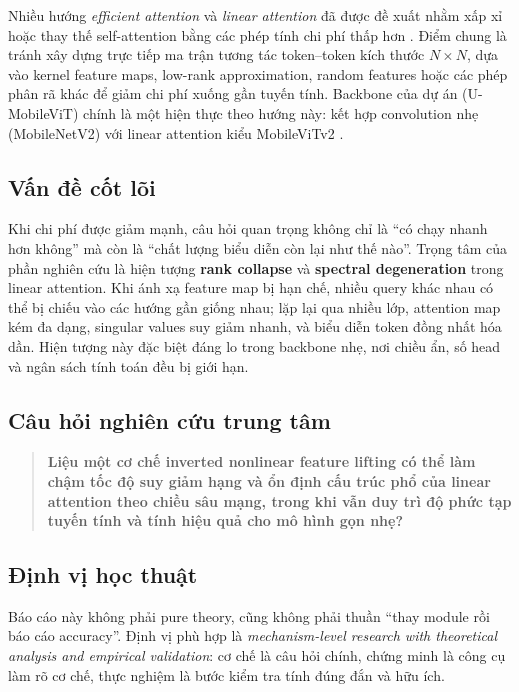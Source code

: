 \documentclass[12pt,a4paper]{article}
\begin{document}
Nhiều hướng \emph{efficient attention} và \emph{linear attention} đã được đề xuất nhằm xấp xỉ hoặc
thay thế self-attention bằng các phép tính chi phí thấp hơn \cite{katharopoulos2020transformers,
shen2020efficient, choromanski2021performer, wang2020linformer, xiong2021nystromformer,
qin2022cosformer}. Điểm chung là tránh xây dựng trực tiếp ma trận tương tác token--token kích thước
$N\times N$, dựa vào kernel feature maps, low-rank approximation, random features hoặc các phép phân
rã khác để giảm chi phí xuống gần tuyến tính. Backbone của dự án (U-MobileViT) chính là một hiện
thực theo hướng này: kết hợp convolution nhẹ (MobileNetV2) với linear attention kiểu MobileViTv2
\cite{mobilenetv2, mobilevitv1, mobilevitv2}.

\subsection{Vấn đề cốt lõi}
Khi chi phí được giảm mạnh, câu hỏi quan trọng không chỉ là ``có chạy nhanh hơn không'' mà còn là
``chất lượng biểu diễn còn lại như thế nào''. Trọng tâm của phần nghiên cứu là hiện tượng
\textbf{rank collapse} và \textbf{spectral degeneration} trong linear attention. Khi ánh xạ feature
map bị hạn chế, nhiều query khác nhau có thể bị chiếu vào các hướng gần giống nhau; lặp lại qua
nhiều lớp, attention map kém đa dạng, singular values suy giảm nhanh, và biểu diễn token đồng nhất
hóa dần. Hiện tượng này đặc biệt đáng lo trong backbone nhẹ, nơi chiều ẩn, số head và ngân sách
tính toán đều bị giới hạn.

\subsection{Câu hỏi nghiên cứu trung tâm}
\begin{quote}
\textbf{Liệu một cơ chế inverted nonlinear feature lifting có thể làm chậm tốc độ suy giảm hạng và
ổn định cấu trúc phổ của linear attention theo chiều sâu mạng, trong khi vẫn duy trì độ phức tạp
tuyến tính và tính hiệu quả cho mô hình gọn nhẹ?}
\end{quote}

\subsection{Định vị học thuật}
Báo cáo này không phải pure theory, cũng không phải thuần ``thay module rồi báo cáo accuracy''.
Định vị phù hợp là \textit{mechanism-level research with theoretical analysis and empirical
validation}: cơ chế là câu hỏi chính, chứng minh là công cụ làm rõ cơ chế, thực nghiệm là bước
kiểm tra tính đúng đắn và hữu ích.
\end{document}
